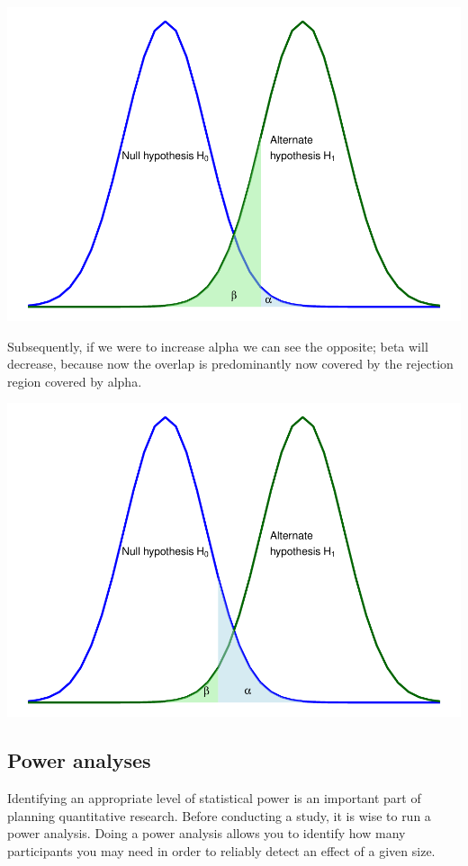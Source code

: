 \documentclass[
]{book}
\begin{document}
\includegraphics{_main_files/figure-latex/unnamed-chunk-98-1.pdf}

Subsequently, if we were to increase alpha we can see the opposite; beta will decrease, because now the overlap is predominantly now covered by the rejection region covered by alpha.

\includegraphics{_main_files/figure-latex/unnamed-chunk-99-1.pdf}

\subsection{Power analyses}\label{power-analyses}

Identifying an appropriate level of statistical power is an important part of planning quantitative research. Before conducting a study, it is wise to run a power analysis. Doing a power analysis allows you to identify how many participants you may need in order to reliably detect an effect of a given size.
\end{document}
